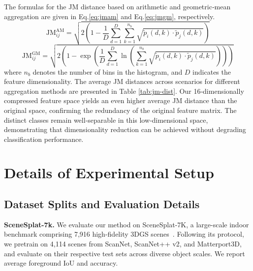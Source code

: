 The formulas for the JM distance based on arithmetic and geometric‑mean aggregation are given in Eq.\eqref{eq:jmam} and Eq.\eqref{eq:jmgm}, respectively.
\begin{equation}
    \text{JM}_{ij}^{\text{AM}} = \sqrt{2 \left(1 - \frac{1}{D} \sum_{d=1}^{D} \sum_{k=1}^{n_{b}} \sqrt{\tilde{p}_i(d,k) \cdot \tilde{p}_j(d,k)}\right)} 
    \label{eq:jmam}
\end{equation}
\begin{equation}
    \text{JM}_{ij}^{\text{GM}} = \sqrt{2 \left(1 - \exp\left(\frac{1}{D} \sum_{d=1}^{D} \ln\left(\sum_{k=1}^{n_{b}} \sqrt{\tilde{p}_i(d,k) \cdot \tilde{p}_j(d,k)}\right)\right)\right)}
    \label{eq:jmgm}
\end{equation}
where $n_b$ denotes the number of bins in the histogram, and $D$ indicates the feature dimensionality. 
The average JM distances across scenarios for different aggregation methods are presented in Table \ref{tab:jm-dist}. Our 16‑dimensionally compressed feature space yields an even higher average JM distance than the original space, confirming the redundancy of the original feature matrix. The distinct classes remain well‑separable in this low‑dimensional space, demonstrating that dimensionality reduction can be achieved without degrading classification performance.


\section{Details of Experimental Setup}
\label{sec:exp_details}

\subsection{Dataset Splits and Evaluation Details}

\noindent\textbf{SceneSplat-7k.} We evaluate our method on SceneSplat-7K, a large-scale indoor benchmark comprising 7,916 high-fidelity 3DGS scenes~\cite{dai2017scannet, yeshwanth2023scannet++, straub2019replica, roberts2021hypersim, wald20193rscan, dehghan2021arkitscenes, chang2017matterport3d}. Following its protocol, we pretrain on 4,114 scenes from ScanNet, ScanNet++ v2, and Matterport3D, and evaluate on their respective test sets across diverse object scales. We report average foreground IoU and accuracy.


